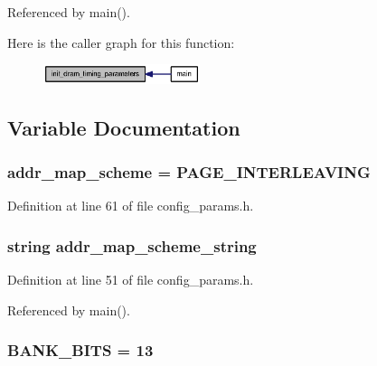 Referenced by main().

Here is the caller graph for this function:\nopagebreak
\begin{figure}[H]
\begin{center}
\leavevmode
\includegraphics[width=130pt]{config__params_8h_a91b414eca2957d22f6a86c695a803c6_icgraph}
\end{center}
\end{figure}


\subsection{Variable Documentation}
\subsubsection[{addr\_\-map\_\-scheme}]{ {\bf addr\_\-map\_\-scheme} = PAGE\_\-INTERLEAVING}\label{config__params_8h_d1a6650288eeca57ccc26007fe8b2ebe}




Definition at line 61 of file config\_\-params.h.
\subsubsection[{addr\_\-map\_\-scheme\_\-string}]{\setlength{\rightskip}{0pt plus 5cm}string {\bf addr\_\-map\_\-scheme\_\-string}}\label{config__params_8h_c4c6117e0110c4a18bdd2b1360cc36e5}




Definition at line 51 of file config\_\-params.h.

Referenced by main().
\subsubsection[{BANK\_\-BITS}]{ {\bf BANK\_\-BITS} = 13}\label{config__params_8h_40e7d425b08789ca96de0a1bc3af2803}




